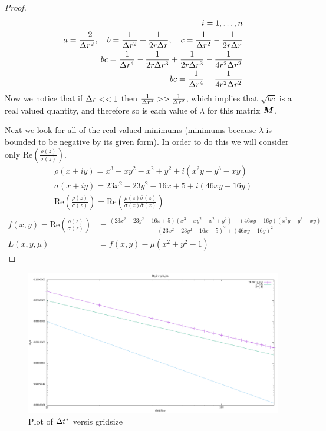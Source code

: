 \documentclass{article}
\begin{document}
\begin{enumerate}[label=\alph*)]
\begin{proof}
\begin{align*}
                i = 1, \ldots, n\\
                a = \frac{-2}{\Delta r^2}, \quad b = \frac{1}{\Delta r^2} +
                \frac{1}{2r\Delta r}, \quad c = \frac{1}{\Delta r^2} -
                \frac{1}{2r\Delta r}\\
                bc = \frac{1}{\Delta r^4} - \frac{1}{2r\Delta r^3} + \frac{1}{2r\Delta r^3} -
                \frac{1}{4r^2\Delta r^2}\\
                bc = \frac{1}{\Delta r^4} - \frac{1}{4r^2\Delta r^2}
            \end{align*}
            Now we notice that if $\Delta r << 1$ then $\frac{1}{\Delta r^4} >>
            \frac{1}{\Delta r^2}$, which implies that $\sqrt{bc}$ is a real valued
            quantity, and therefore so is each value of $\lambda$ for this
            matrix $\boldsymbol{M}$. 

            Next we look for all of the real-valued minimums (minimums because
            $\lambda$ is bounded to be negative by its given form). In order to
            do this we will consider only Re$\left(\frac{\rho(z)}{\sigma(z)}\right)$. 
            \begin{align*}
                \rho(x+iy) = x^3 - xy^2 - x^2 + y^2 + i(x^2y - y^3 -xy)\\
                \sigma(x+iy) = 23x^2 - 23y^2 - 16x + 5 + i\left(46xy -
                16y\right)\\
                \text{Re}\left(\frac{\rho(z)}{\sigma(z)}\right) =
                \text{Re}\left(\frac{\rho(z)\bar{\sigma}(z)}{\sigma(z)\bar{\sigma}(z)}\right)\\
            \end{align*}
            \begin{align*}
                f(x,y) = \text{Re}\left(\frac{\rho(z)}{\sigma(z)}\right) &= \frac{(23x^2 -
                23y^2 - 16x + 5)(x^3 - xy^2 - x^2 + y^2) - \left(46xy -  16y\right)\left(x^2y - y^3 -xy\right)}
                {(23x^2 - 23y^2 - 16x + 5)^2 + \left(46xy - 16y\right)^2}\\
                L(x,y,\mu) &= f(x,y) - \mu(x^2 + y^2 - 1)
            \end{align*}
        \end{proof}
        \begin{figure}[ht]
            \centering
            \includegraphics[width=.8\textwidth]{dt.png}
            \caption{Plot of $\Delta t^*$ versis gridsize}
        \end{figure}


\end{enumerate}
\end{document}
